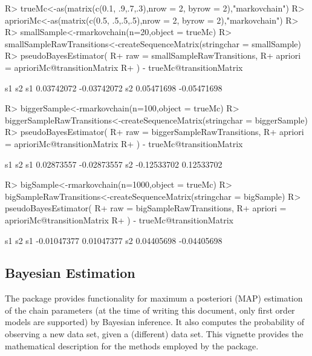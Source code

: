 \documentclass[
  nojss]{jss}
\begin{document}
\begin{CodeChunk}

\begin{CodeInput}
R> trueMc<-as(matrix(c(0.1, .9,.7,.3),nrow = 2, byrow = 2),"markovchain")
R> aprioriMc<-as(matrix(c(0.5, .5,.5,.5),nrow = 2, byrow = 2),"markovchain")
R> 
R> smallSample<-rmarkovchain(n=20,object = trueMc)
R> smallSampleRawTransitions<-createSequenceMatrix(stringchar = smallSample)
R> pseudoBayesEstimator(
R+   raw = smallSampleRawTransitions, 
R+   apriori = aprioriMc@transitionMatrix
R+ ) - trueMc@transitionMatrix
\end{CodeInput}

\begin{CodeOutput}
           s1          s2
s1 0.03742072 -0.03742072
s2 0.05471698 -0.05471698
\end{CodeOutput}

\begin{CodeInput}
R> biggerSample<-rmarkovchain(n=100,object = trueMc)
R> biggerSampleRawTransitions<-createSequenceMatrix(stringchar = biggerSample)
R> pseudoBayesEstimator(
R+   raw = biggerSampleRawTransitions,
R+   apriori = aprioriMc@transitionMatrix
R+ ) - trueMc@transitionMatrix
\end{CodeInput}

\begin{CodeOutput}
            s1          s2
s1  0.02873557 -0.02873557
s2 -0.12533702  0.12533702
\end{CodeOutput}

\begin{CodeInput}
R> bigSample<-rmarkovchain(n=1000,object = trueMc)
R> bigSampleRawTransitions<-createSequenceMatrix(stringchar = bigSample)
R> pseudoBayesEstimator(
R+   raw = bigSampleRawTransitions,
R+   apriori = aprioriMc@transitionMatrix
R+ ) - trueMc@transitionMatrix
\end{CodeInput}

\begin{CodeOutput}
            s1          s2
s1 -0.01047377  0.01047377
s2  0.04405698 -0.04405698
\end{CodeOutput}
\end{CodeChunk}

\hypertarget{bayesian-estimation}{%
\subsection{Bayesian Estimation}\label{bayesian-estimation}}

The  package provides functionality for maximum a posteriori (MAP) estimation of the chain parameters (at the time of writing this document, only first order models are supported) by Bayesian inference. It also computes the probability of observing a new data set, given a (different) data set. This vignette provides the mathematical description for the methods employed by the package.
\end{document}
